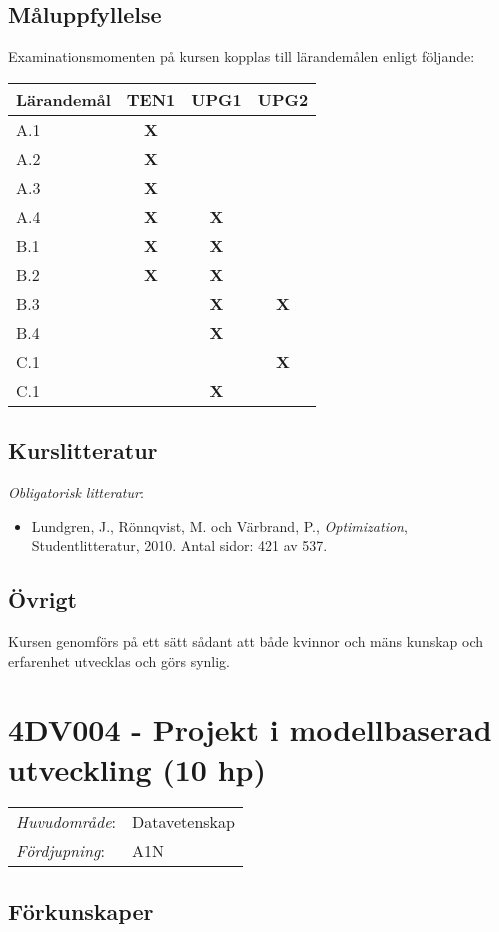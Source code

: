 \subsection*{Måluppfyllelse}

Examinationsmomenten på kursen kopplas till lärandemålen enligt
följande:

\begin{longtable}[]{@{}lccc@{}}
\toprule
Lärandemål & TEN1 & UPG1 & UPG2\tabularnewline
\midrule
\endhead
A.1 & \textbf{X} & &\tabularnewline
A.2 & \textbf{X} & &\tabularnewline
A.3 & \textbf{X} & &\tabularnewline
A.4 & \textbf{X} & \textbf{X} &\tabularnewline
B.1 & \textbf{X} & \textbf{X} &\tabularnewline
B.2 & \textbf{X} & \textbf{X} &\tabularnewline
B.3 & & \textbf{X} & \textbf{X}\tabularnewline
B.4 & & \textbf{X} &\tabularnewline
C.1 & & & \textbf{X}\tabularnewline
C.1 & & \textbf{X} &\tabularnewline
\bottomrule
\end{longtable}

\subsection*{Kurslitteratur}

\emph{Obligatorisk litteratur}:

\begin{itemize}
\tightlist
\item
  Lundgren, J., Rönnqvist, M. och Värbrand, P., \emph{Optimization},
  Studentlitteratur, 2010. Antal sidor: 421 av 537.
\end{itemize}

\subsection*{Övrigt}

Kursen genomförs på ett sätt sådant att både kvinnor och mäns kunskap och erfarenhet utvecklas och görs synlig.
\pagebreak
\section*{4DV004 - Projekt i modellbaserad utveckling (10 hp)}

\begin{tabular}{ll}\emph{Huvudområde}: & Datavetenskap\tabularnewline\emph{Fördjupning}: & A1N\tabularnewline\end{tabular}

\subsection*{Förkunskaper}


